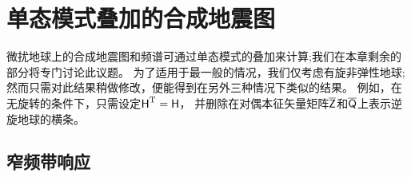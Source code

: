 {{{%
\section{单态模式叠加的合成地震图}
%
%

微扰地球上的合成地震图和频谱可通过单态模式的叠加来计算;我们在本章剩余的部分将专门讨论此议题。
为了适用于最一般的情况，我们仅考虑有旋非弹性地球;
然而只需对此结果稍做修改，便能得到在另外三种情况下类似的结果。
例如，在无旋转的条件下，只需设定$\mbox{${\sf H}$}^{\rm T}=\mbox{${\sf H}$}$，
并删除在对偶本征矢量矩阵$\overline{\mbox{${\sf Z}$}}$和$\overline{\mbox{${\sf Q}$}}$上表示逆旋地球的横条。
%
%
%

\subsection{窄频带响应}
%
%

}}}

